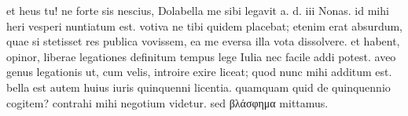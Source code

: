  et heus tu! ne forte sis nescius, Dolabella me sibi legavit a. d. iii Nonas. id mihi heri vesperi nuntiatum est. votiva ne tibi quidem placebat; etenim erat absurdum, quae si stetisset res publica vovissem, ea me eversa illa vota dissolvere. et habent, opinor, liberae legationes definitum tempus lege Iulia nec facile addi potest. aveo genus legationis ut, cum velis, introire exire liceat; quod nunc mihi additum est. bella est autem huius iuris quinquenni licentia. quamquam quid de quinquennio cogitem? contrahi mihi negotium videtur. sed βλάσφημα mittamus.
